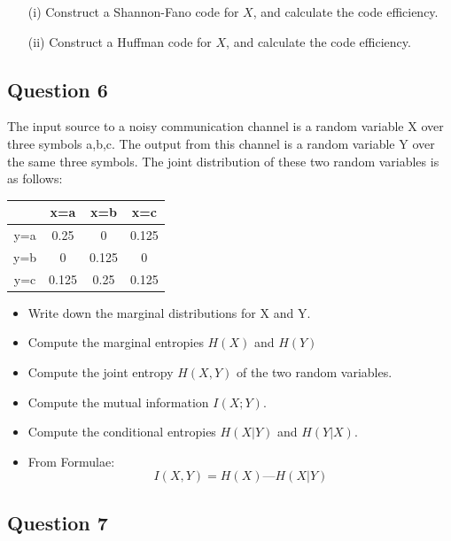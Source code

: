 \documentclass[a4paper,12pt]{article}
\begin{document}
\begin{itemize}
\item[(i)] Construct a Shannon-Fano code for $X$, and calculate the code efficiency.
\item[(ii)] Construct a Huffman code for $X$, and calculate the code efficiency.
\end{itemize}


\subsection*{Question 6}

The input source to a noisy communication channel is a random variable X over three symbols a,b,c. The output from this channel is a random variable Y over the same three symbols. The joint distribution of these two random variables is as follows:


\begin{center}
\begin{tabular}{|c|c|c|c|}
\hline	 &x=a	&x=b&	     x=c\\ \hline
y=a	 &0.25	&0	 &    0.125 \\ \hline
y=b	 &0	    &0.125&	 0 \\ \hline
y=c	 &0.125&	0.25&	 0.125 \\ \hline
\end{tabular} 
\end{center}

\begin{itemize}
\item Write down the marginal distributions for X and Y. %
\item Compute the marginal entropies $H(X)$ and $H(Y)$ %
\item Compute the joint entropy $H(X,Y)$ of the two random variables. %
\item
Compute the mutual information $I(X;Y)$.
\item 
Compute the conditional entropies $H(X|Y)$ and $H(Y|X)$.
\item 
From Formulae: \[I(X,Y) = H(X) — H(X|Y)\]
\end{itemize}
\subsection*{Question 7}
\end{document}
